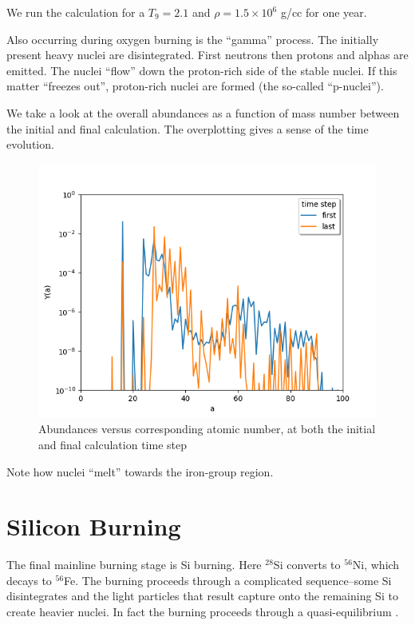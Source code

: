 \documentclass[manuscript]{aastex62}
\begin{document}
We run the calculation for a $T_9 = 2.1$ and $\rho = 1.5\times 10^6$ g/cc for one year.

Also occurring during oxygen burning is the ``gamma'' process.  The initially
present heavy nuclei are disintegrated.  First neutrons then protons and
alphas are emitted.  The nuclei ``flow'' down the proton-rich side of the
stable nuclei.  If this matter ``freezes out'', proton-rich nuclei are
formed (the so-called ``p-nuclei'').


We take a look at the overall abundances as a function of mass number between the initial and final calculation. The overplotting gives a sense of the time evolution.

\begin{figure}[H]
\centering
\includegraphics[scale=0.7]{task7}
\caption{Abundances versus corresponding atomic number, at both the initial and final calculation time step}
\end{figure}

Note how nuclei ``melt'' towards the
iron-group region. 

\section{Silicon Burning} \label{sec:Si}

The final mainline burning stage is Si burning.  Here $^{28}$Si converts to
$^{56}$Ni, which decays to $^{56}$Fe.  The burning proceeds through a
complicated sequence--some Si disintegrates and the light particles that result
capture onto the remaining Si to create heavier nuclei.  In fact the
burning proceeds through a quasi-equilibrium
\cite{1968ApJS...16..299B,1998ApJ...498..808M}.
\end{document}
